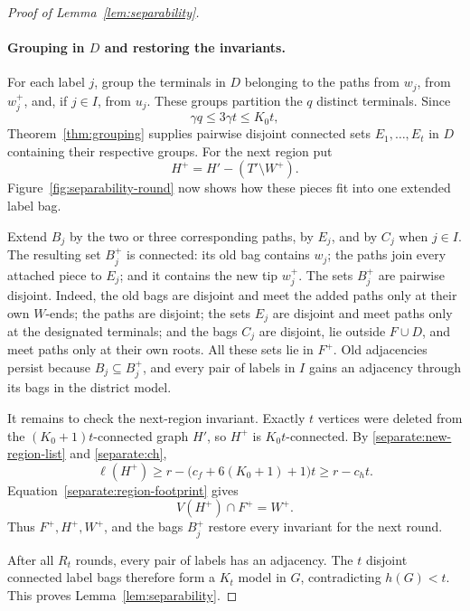 \begin{proof}[Proof of Lemma~\ref{lem:separability}]
\paragraph{Grouping in \(D\) and restoring the invariants.}
For each label \(j\), group the terminals in \(D\) belonging to
the paths from \(w_j\), from \(w_j^+\), and, if \(j\in I\),
from \(u_j\). These groups partition the \(q\) distinct terminals.
Since
\[
 \gamma q\le3\gamma t\le K_0t,
\]
Theorem~\ref{thm:grouping} supplies pairwise disjoint connected
sets \(E_1,\ldots,E_t\) in \(D\) containing their respective groups.
For the next region put
\[
 H^+=H'-(T'\setminus W^+).
\]
Figure~\ref{fig:separability-round} now shows how these pieces fit
into one extended label bag.



Extend \(B_j\) by the two or three corresponding paths, by \(E_j\),
and by \(C_j\) when \(j\in I\). The resulting set \(B_j^+\) is
connected: its old bag contains \(w_j\); the paths join every
attached piece to \(E_j\); and it contains the new tip \(w_j^+\).
The sets \(B_j^+\) are pairwise disjoint. Indeed, the old bags
are disjoint and meet the added paths only at their own \(W\)-ends;
the paths are disjoint; the sets \(E_j\) are disjoint and meet paths
only at the designated terminals; and the bags \(C_j\) are
disjoint, lie outside \(F\cup D\), and meet paths only at their
own roots. All these sets lie in \(F^+\).
Old adjacencies persist because \(B_j\subseteq B_j^+\), and every
pair of labels in \(I\) gains an adjacency through its bags in
the district model.

It remains to check the next-region invariant. Exactly \(t\) vertices
were deleted from the \((K_0+1)t\)-connected
graph \(H'\), so \(H^+\) is \(K_0t\)-connected. By
\eqref{separate:new-region-list} and \eqref{separate:ch},
\[
 \ell(H^+)
 \ge r-\bigl(c_f+6(K_0+1)+1\bigr)t
 \ge r-c_ht.
\]
Equation~\eqref{separate:region-footprint} gives
\[
 V(H^+)\cap F^+=W^+.
\]
Thus \(F^+,H^+,W^+\), and the bags \(B_j^+\) restore every
invariant for the next round.

After all \(R_t\) rounds, every pair of labels has an adjacency.
The \(t\) disjoint connected label bags therefore form a \(K_t\)
model in \(G\), contradicting \(h(G)<t\).
This proves Lemma~\ref{lem:separability}.
\end{proof}
